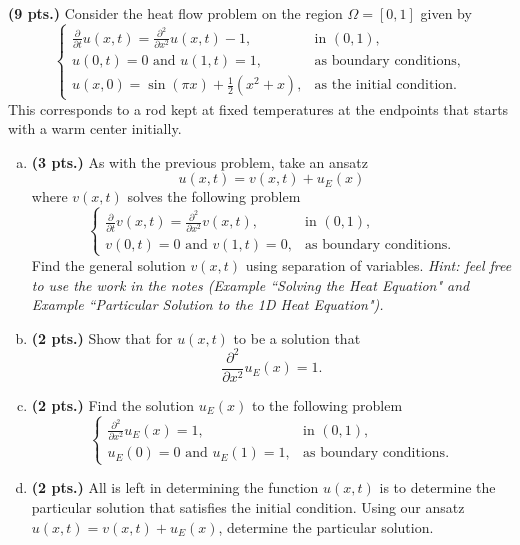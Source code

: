 \documentclass[12pt]{article} %
\begin{document}
\begin{problem}
\textbf{(9 pts.)} Consider the heat flow problem on the region $\Omega=[0,1]$ given by
\[
\begin{cases}
\frac{\partial}{\partial t} u(x,t) = \frac{\partial^2}{\partial x^2} u(x,t) - 1, & \textrm{in $(0,1)$},\\
u(0,t)=0 \textrm{~and~} u(1,t)=1, & \text{as boundary conditions},\\
u(x,0) = \sin\left(\pi x\right) + \frac{1}{2}(x^2+x), & \textrm{as the initial condition}.
\end{cases}
\]
This corresponds to a rod kept at fixed temperatures at the endpoints that starts with a warm center initially.
\begin{enumerate}[(a)]
    \item \textbf{(3 pts.)} As with the previous problem, take an ansatz
    \[
    u(x,t) = v(x,t) + u_E(x)
    \]
    where $v(x,t)$ solves the following problem
    \[
\begin{cases}
\frac{\partial}{\partial t} v(x,t) = \frac{\partial^2}{\partial x^2} v(x,t), & \textrm{in $(0,1)$},\\
v(0,t)=0 \textrm{~and~} v(1,t)=0, & \text{as boundary conditions}.
\end{cases}
    \]
    Find the general solution $v(x,t)$ using separation of variables. \emph{Hint: feel free to use the work in the notes (Example ``Solving the Heat Equation" and Example ``Particular Solution to the 1D Heat Equation").}

    \item \textbf{(2 pts.)} Show that for $u(x,t)$ to be a solution that
    \[
    \frac{\partial^2}{\partial x^2} u_E(x) = 1.
    \]

    \item \textbf{(2 pts.)} Find the solution $u_E(x)$ to the following problem
    \[
    \begin{cases}
    \frac{\partial^2}{\partial x^2} u_E(x) = 1, & \textrm{in $(0,1)$},\\
    u_E(0)=0 \textrm{~and~} u_E(1)=1, & \text{as boundary conditions}.
    \end{cases}
    \]
    
    \item \textbf{(2 pts.)} All is left in determining the function $u(x,t)$ is to determine the particular solution that satisfies the initial condition. Using our ansatz $u(x,t)=v(x,t)+u_E(x)$, determine the particular solution.
\end{enumerate}
\end{problem}
\end{document}
